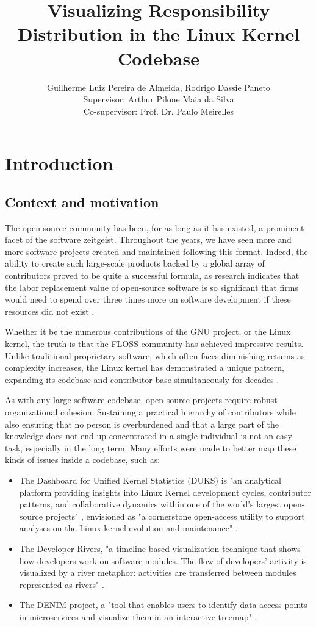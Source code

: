 \documentclass[a4paper,12pt,oneside,english,brazilian]{article}
\title{Visualizing Responsibility Distribution in the Linux Kernel Codebase}
\author{
	Guilherme Luiz Pereira de Almeida,
	Rodrigo Dassie Paneto \\
	Supervisor: Arthur Pilone Maia da Silva\\
	Co-supervisor: Prof. Dr. Paulo Meirelles
}
\date{}
\begin{document}
	
	\maketitle
	
	\section{Introduction}
	\subsection{Context and motivation}
	The open-source community has been, for as long as it has existed, a prominent facet of the software zeitgeist. Throughout the years, we have seen more and more software projects created and maintained following this format. Indeed, the ability to create such large-scale products backed by a global array of contributors proved to be quite a successful formula, as research indicates that the labor replacement value of open-source software is so significant that firms would need to spend over three times more on software development if these resources did not exist \cite{oValue} .
	\par Whether it be the numerous contributions of the GNU project, or the Linux kernel, the truth is that the FLOSS community has achieved impressive results. Unlike traditional proprietary software, which often faces diminishing returns as complexity increases, the Linux kernel has demonstrated a unique pattern, expanding its codebase and contributor base simultaneously for decades \cite{evoSoft} .
	\par As with any large software codebase, open-source projects require robust organizational cohesion. Sustaining a practical hierarchy of contributors while also ensuring that no person is overburdened and that a large part of the knowledge does not end up concentrated in a single individual is not an easy task, especially in the long term. Many efforts were made to better map these kinds of issues inside a codebase, such as:
	
	\begin{itemize}
		\item The Dashboard for Unified Kernel Statistics (DUKS)  is "an analytical platform providing insights into Linux Kernel development cycles, contributor patterns, and collaborative dynamics within one of the world's largest open-source projects"  \cite{duks}, envisioned as "a cornerstone open-access utility to support analyses on the Linux kernel evolution and maintenance" \cite{streamline}.
		\item The Developer Rivers, "a timeline-based visualization technique that shows how developers work on software modules. The flow of developers' activity is visualized by a river metaphor: activities are transferred between modules represented as rivers" \cite{rivers}.
		\item The DENIM project, a "tool that enables users to identify data access points in microservices and visualize them in an interactive treemap" \cite{denim}. 
	\end{itemize}
	
\end{document}
